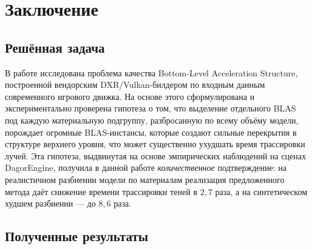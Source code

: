 \section{Заключение}
\label{sec:Chapter5} 

\subsection{Решённая задача}

В работе исследована проблема качества Bottom-Level Acceleration
Structure, построенной вендорским DXR/Vulkan-билдером по входным
данным современного игрового движка. На основе этого сформулирована и
экспериментально проверена гипотеза о том, что выделение отдельного BLAS под каждую материальную подгруппу, разбросанную по всему объёму модели, порождает огромные BLAS-инстансы,
которые создают сильные перекрытия в структуре верхнего уровня,
что может существенно ухудшать время трассировки лучей. Эта гипотеза, выдвинутая на основе
эмпирических наблюдений на сценах
DagorEngine, получила в данной работе
\emph{количественное} подтверждение: на реалистичном разбиении модели
по материалам реализация предложенного метода даёт снижение времени
трассировки теней в $2{,}7$ раза, а на синтетическом худшем
разбиении --- до $8{,}6$ раза.

\subsection{Полученные результаты}


